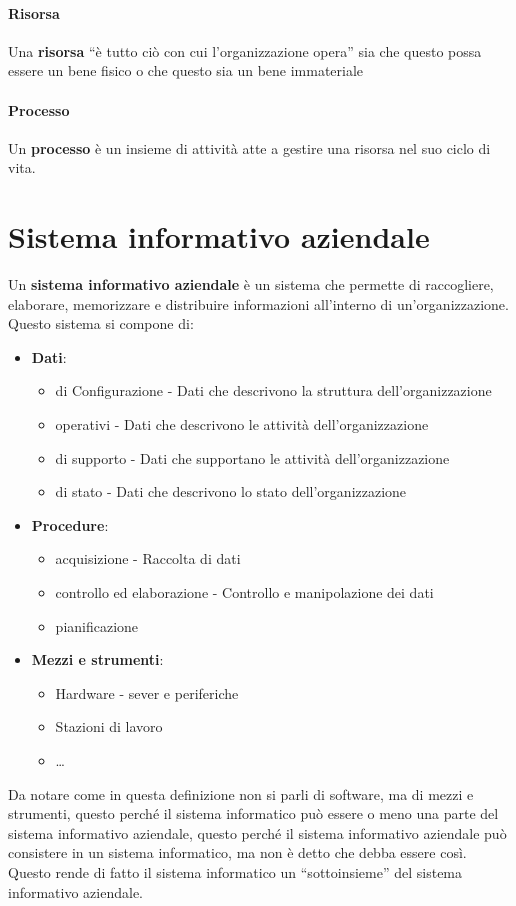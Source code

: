    \paragraph{Risorsa} Una \textbf{risorsa} ``è tutto ciò con cui l'organizzazione opera'' sia che questo possa essere un bene fisico o che questo sia un bene immateriale
    \paragraph{Processo} Un \textbf{processo} è un insieme di attività atte a gestire una risorsa nel suo ciclo di vita.
\section{Sistema informativo aziendale}
    Un \textbf{sistema informativo aziendale} è un sistema che permette di raccogliere, elaborare, memorizzare e distribuire informazioni all'interno di un'organizzazione. Questo sistema si compone di:
    \begin{itemize}
        \item \textbf{Dati}: \begin{itemize}
            \item di Configurazione - Dati che descrivono la struttura dell'organizzazione
            \item operativi - Dati che descrivono le attività dell'organizzazione
            \item di supporto - Dati che supportano le attività dell'organizzazione
            \item di stato - Dati che descrivono lo stato dell'organizzazione
        \end{itemize}
        \item \textbf{Procedure}: \begin{itemize}
            \item acquisizione - Raccolta di dati
            \item controllo ed elaborazione - Controllo e manipolazione dei dati
            \item pianificazione
        \end{itemize}
        \item \textbf{Mezzi e strumenti}: \begin{itemize}
            \item Hardware - sever e periferiche
            \item Stazioni di lavoro
            \item \dots
        \end{itemize}
    \end{itemize}
    Da notare come in questa definizione non si parli di software, ma di mezzi e strumenti, questo perché il sistema informatico può essere o meno una parte del sistema informativo aziendale, questo perché il sistema informativo aziendale può consistere in un sistema informatico, ma non è detto che debba essere così. Questo rende di fatto il sistema informatico un ``sottoinsieme'' del sistema informativo aziendale.
